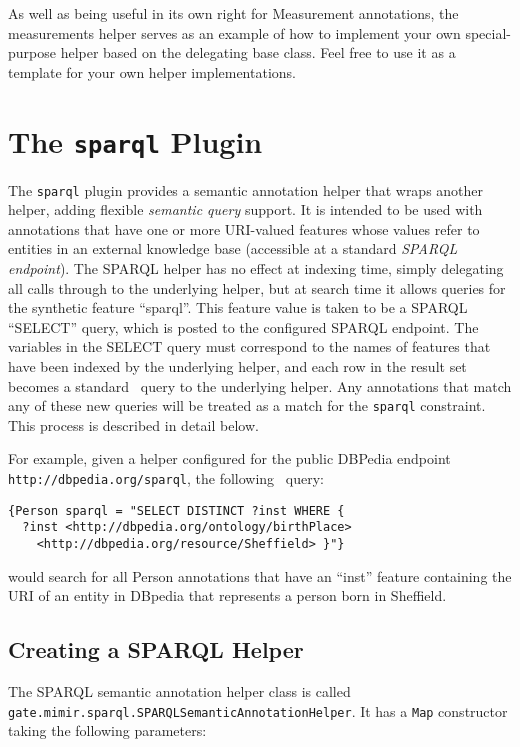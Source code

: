 As well as being useful in its own right for Measurement annotations, the
measurements helper serves as an example of how to implement your own
special-purpose helper based on the delegating base class.  Feel free to use it
as a template for your own helper implementations.

\section{The {\tt sparql} Plugin}\label{sec:plugins:sparql}

The {\tt sparql} plugin provides a semantic annotation helper that wraps
another helper, adding flexible {\em semantic query} support.  It is intended
to be used with annotations that have one or more URI-valued features whose
values refer to entities in an external knowledge base (accessible at a
standard {\em SPARQL endpoint}).  The SPARQL helper has no effect at indexing
time, simply delegating all calls through to the underlying helper, but at
search time it allows queries for the synthetic feature ``sparql''.  This
feature value is taken to be a SPARQL ``SELECT'' query, which is posted
to the configured SPARQL endpoint.  The variables in the SELECT query must
correspond to the names of features that have been indexed by the underlying
helper, and each row in the result set becomes a standard \Mimir\ query to the
underlying helper.  Any annotations that match any of these new queries will be
treated as a match for the {\tt sparql} constraint.  This process is described
in detail below.

For example, given a helper configured for the public DBPedia endpoint
{\tt http://dbpedia.org/sparql}, the following \Mimir\ query:
\begin{verbatim}
{Person sparql = "SELECT DISTINCT ?inst WHERE {
  ?inst <http://dbpedia.org/ontology/birthPlace>
    <http://dbpedia.org/resource/Sheffield> }"}
\end{verbatim}
would search for all Person annotations that have an ``inst'' feature
containing the URI of an entity in DBpedia that represents a person born in
Sheffield.


\subsection{Creating a SPARQL Helper}

The SPARQL semantic annotation helper class is called
\lstinline!gate.mimir.sparql.SPARQLSemanticAnnotationHelper!.  It has a
{\tt Map} constructor taking the following parameters:

